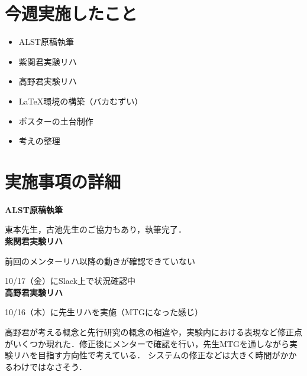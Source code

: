 \documentclass[a4paper,12pt]{ltjsarticle}
\begin{document}

\section{今週実施したこと}
\begin{itemize}
  \item ALST原稿執筆
  \item 紫関君実験リハ
  \item 高野君実験リハ
  \item LaTeX環境の構築（バカむずい）
  \item ポスターの土台制作
  \item 考えの整理
\end{itemize}
\clearpage

\section{実施事項の詳細}
\textbf{ALST原稿執筆}\par
東本先生，古池先生のご協力もあり，執筆完了．\\

\textbf{紫関君実験リハ}\par
前回のメンターリハ以降の動きが確認できていない\par
10/17（金）にSlack上で状況確認中\\

\textbf{高野君実験リハ}\par
10/16（木）に先生リハを実施（MTGになった感じ）\par
高野君が考える概念と先行研究の概念の相違や，実験内における表現など修正点がいくつか現れた．修正後にメンターで確認を行い，先生MTGを通しながら実験リハを目指す方向性で考えている．
システムの修正などは大きく時間がかかるわけではなさそう．\\
\end{document}

